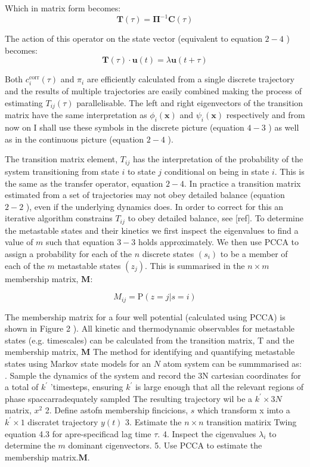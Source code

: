Which in matrix form becomes: 
\begin{equation}
\mathbf{T}(\tau)=\mathbf{\Pi}^{-1} \mathbf{C}(\tau)
\end{equation}

The action of this operator on the state vector (equivalent to equation $2-4$ ) becomes:
\begin{equation}
\mathbf{T}(\tau) \cdot \mathbf{u}(t)=\lambda \mathbf{u}(t+\tau)
\end{equation}
 
 Both $c_{i}^{\text {corr}}(\tau)$ and $\pi_{i}$ are efficiently calculated from a single discrete trajectory and the results of multiple trajectories are easily combined making the process of estimating $T_{i j}(\tau)$ parallelisable. The left and right eigenvectors of the transition matrix have the same interpretation as $\phi_{i}(\mathbf{x})$ and $\psi_{i}(\mathbf{x})$ respectively and from now on I shall use these symbols in the discrete picture (equation $4-3$ ) as well as in the continuous picture (equation $2-4$ ).

The transition matrix element, $T_{i j}$ has the interpretation of the probability of the system transitioning from state $i$ to state $j$ conditional on being in state $i .$ This is the same as the transfer operator, equation $2-4 .$ In practice a transition matrix estimated from a set of trajectories may not obey detailed balance (equation $2-2$ ), even if
the underlying dynamics does. In order to correct for this an iterative algorithm constrains $T_{i j}$ to obey detailed balance, see [ref].
To determine the metastable states and their kinetics we first inspect the eigenvalues to find a value of $m$ such that equation $3-3$ holds approximately. We then use PCCA to assign a probability for each of the $n$ discrete states $\left(s_{i}\right)$ to be a member of each of the $m$ metastable states $\left(z_{j}\right)$. This is summarised in the $n \times m$ membership matrix, $\mathbf{M}$:

\[
M_{i j}=\mathrm{P}(z=j | s=i)
\]

The membership matrix for a four well potential (calculated using PCCA) is shown in Figure 2 ). All kinetic and thermodynamic observables for metastable states (e.g. timescales) can be calculated from the transition matrix, T and the membership matrix, $\mathbf{M}$
The method for identifying and quantifying metastable states using Markov state models for an $N$ atom system can be summmarised as:
. Sample the dynamics of the system and record the $3 \mathrm{N}$ cartesian coordinates for a total of $k^{\prime}$ 'timesteps, ensuring $k^{\prime}$ is large enough that all the relevant regions of phase spaccarradequately sampled The resulting trajectory wil be a $k^{\prime} \times 3 N$ matrix, $x^{2}$
2. Define astofn membership fincicions, $s$ which transform x imto a $k^{\prime} \times 1$ discratet trajectory $y(t)$
3. Estimate the $n \times n$ transition matirix Twing equation 4.3 for apre-specificad lag time $\tau$.
4. Inspect the cigenvalues $\lambda_{i}$ to determine the $m$ dominant cigenvectors.
5. Use PCCA to estimate the membership matrix.$\mathbf{M}$.


